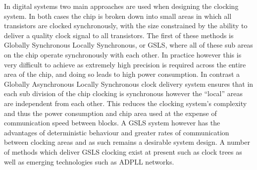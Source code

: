 \documentclass[11pt,english,british]{report}
\begin{document}
In digital systems two main approaches are used when designing the clocking system. In both cases the chip is broken down into small areas in which all transistors are clocked synchronously, with the size constrained by the ability to deliver a quality clock signal to all transistors. The first of these methods is Globally Synchronous Locally Synchronous, or GSLS, where all of these sub areas on the chip operate synchronously with each other. In practice however this is very difficult to achieve as extremely high precision is required across the entire area of the chip, and doing so leads to high power consumption.
In contrast a Globally Asynchronous Locally Synchronous clock delivery system ensures that in each sub division of the chip clocking is synchronous however the ``local'' areas are independent from each other. This reduces the clocking system's complexity and thus the power consumption and chip area used at the expense of communication speed between blocks. %
A GSLS system however has the advantages of deterministic behaviour and greater rates of communication between clocking areas and as such remains a desirable system design. A number of methods which deliver GSLS clocking exist at present such as clock trees as well as emerging technologies such as ADPLL networks.
\end{document}
